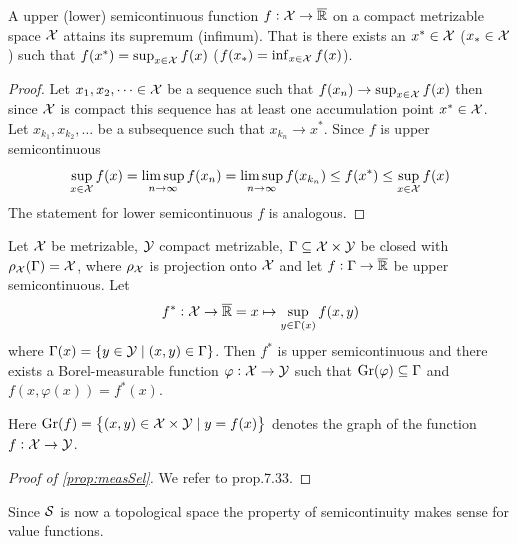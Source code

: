 \begin{prop}
  A upper (lower) semicontinuous function $f: \mathcal{X} \to \overline{\mathbb{R}}$ on a compact
  metrizable space $\mathcal{X}$ attains its
  supremum (infimum). That is there exists an $x^* \in \mathcal{X}$ 
  ($x_* \in \mathcal{X}$) such that
  $f(x^*) = \sup_{x \in \mathcal{X}} f(x)$
  ($f(x_*) = \inf_{x \in \mathcal{X}} f(x)$).
  \label{prop:supSemiC}
\end{prop}
\begin{proof}
  Let $x_1, x_2, \dots \in \mathcal{X}$ be a sequence such that
  $f(x_n) \to \sup_{x \in \mathcal{X}} f(x)$ then since $\mathcal{X}$ is compact
  this sequence has at least one accumulation point $x^* \in \mathcal{X}$.
  Let $x_{k_1}, x_{k_2}, \dots$ be a subsequence such that $x_{k_n} \to x^*$.
  Since $f$ is upper semicontinuous
  \[ \sup_{x \in \mathcal{X}} f(x) = \limsup_{n \to \infty} f(x_n)
    = \limsup_{n \to \infty} f(x_{k_n}) \leq f(x^*)
  \leq \sup_{x \in \mathcal{X}} f(x) \]
  The statement for lower semicontinuous $f$ is analogous.
\end{proof}

\begin{prop}
  Let $\mathcal{X}$ be metrizable, $\mathcal{Y}$ compact metrizable,
  $\Gamma \subseteq \mathcal{X} \times \mathcal{Y}$ be closed with
  $\rho_\mathcal{X} (\Gamma) = \mathcal{X}$, where
  $\rho_\mathcal{X}$ is projection onto $\mathcal{X}$
  and let $f : \Gamma \to \overline{\mathbb{R}}$ be upper semicontinuous. Let
  \[ f^* : \mathcal{X} \to \overline{\mathbb{R}} = x \mapsto \sup_{y \in \Gamma(x)} f(x, y) \]
  where $\Gamma(x) = \{ y \in \mathcal{Y} \mid (x, y) \in \Gamma \}$.
  Then $f^*$ is upper semicontinuous and there exists a Borel-measurable
  function $\varphi : \mathcal{X} \to \mathcal{Y}$ such that
  $\mathrm{Gr}(\varphi) \subseteq \Gamma$ and
  $f(x, \varphi(x)) = f^*(x)$.
  \label{prop:measSel}
\end{prop}

\begin{rem}
  Here $\mathrm{Gr}(f) = \left\{ (x, y) \in \mathcal{X} \times \mathcal{Y}
  \mid y = f(x) \right\}$ denotes the graph of the function
  $f : \mathcal{X} \to \mathcal{Y}$.
\end{rem}

\begin{proof}[Proof of \cref{prop:measSel}]
  We refer to  prop.7.33.
\end{proof}

Since $\mathcal{S}$ is now a topological space the property of semicontinuity
makes sense for value functions.

